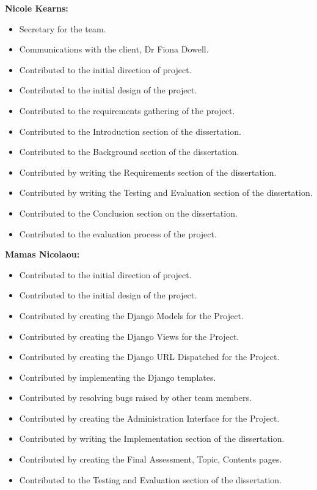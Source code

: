 \documentclass{l3proj}
\begin{document}
\textbf{Nicole Kearns:}

\begin{itemize}
\item Secretary for the team.
\item Communications with the client, Dr Fiona Dowell.
\item Contributed to the initial direction of project.
\item Contributed to the initial design of the project.
\item Contributed to the requirements gathering of the project.
\item Contributed to the Introduction section of the dissertation.
\item Contributed to the Background section of the dissertation.
\item Contributed by writing the Requirements section of the dissertation.
\item Contributed by writing the Testing and Evaluation section of the dissertation.
\item Contributed to the Conclusion section on the dissertation.
\item Contributed to the evaluation process of the project.
\end{itemize}

\textbf{Mamas Nicolaou:}
\begin{itemize}
\item Contributed to the initial direction of project.
\item Contributed to the initial design of the project.
\item Contributed by creating the Django Models for the Project.
\item Contributed by creating the Django Views for the Project.
\item Contributed by creating the Django URL Dispatched for the Project.
\item Contributed by implementing the Django templates.
\item Contributed by resolving bugs raised by other team members.
\item Contributed by creating the Administration Interface for the Project.
\item Contributed by writing the Implementation section of the dissertation.
\item Contributed by creating the Final Assessment, Topic, Contents pages.
\item Contributed to the Testing and Evaluation section of the dissertation.
\end{itemize}
\end{document}
